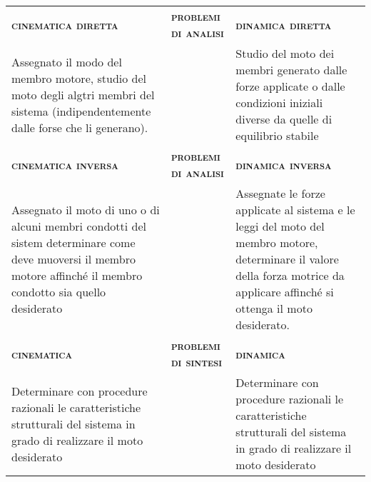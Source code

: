\begin{table}[!h]
\centering
\begin{NiceTabular}{R{0.33\columnwidth}Y{0.33\columnwidth}P{0.33\columnwidth}}
    \midrule
    {\scshape{\bfseries cinematica diretta}} & {\scshape{\bfseries problemi di analisi}} & {\scshape{\bfseries dinamica diretta}}\\
    Assegnato il modo del membro motore, studio del moto degli algtri membri del sistema (indipendentemente dalle forse che li generano). && Studio del moto dei membri generato dalle forze applicate o dalle condizioni iniziali diverse da quelle di equilibrio stabile\\
    \midrule
    {\scshape{\bfseries cinematica inversa}} & {\scshape{\bfseries problemi di analisi}} & {\scshape{\bfseries dinamica inversa}}\\
    Assegnato il moto di uno o di alcuni membri condotti del sistem determinare come deve muoversi il membro motore affinché il membro condotto sia quello desiderato && Assegnate le forze applicate al sistema e le leggi del moto del membro motore, determinare il valore della forza motrice da applicare affinché si ottenga il moto desiderato.\\
    \midrule
    {\scshape{\bfseries cinematica }}&{\scshape{\bfseries problemi di sintesi}}&{\scshape{\bfseries dinamica}}\\
    Determinare con procedure razionali le caratteristiche strutturali del sistema in grado di realizzare il moto desiderato && Determinare con procedure razionali le caratteristiche strutturali del sistema in grado di realizzare il moto desiderato
\end{NiceTabular}
\end{table}
